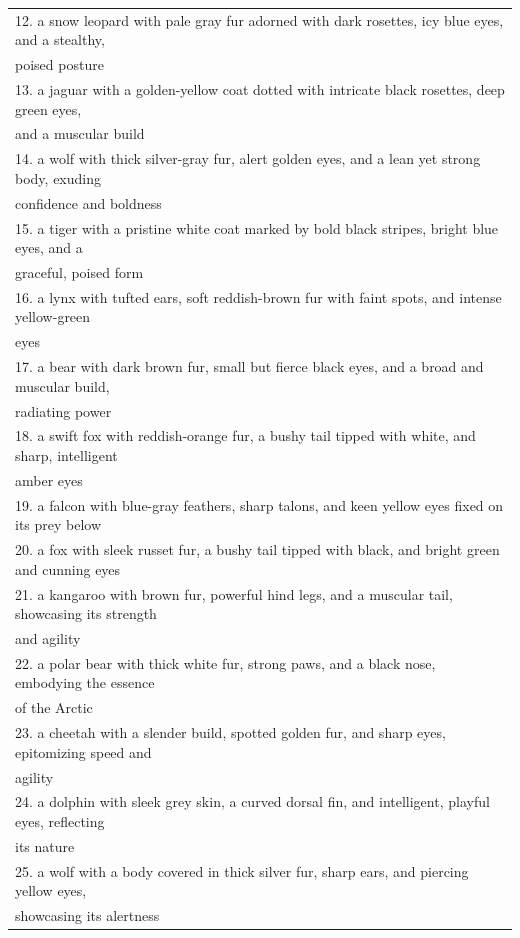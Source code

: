 \begin{table}[!ht]
\begin{threeparttable}
{\begin{tabular}{l}
12. a snow leopard with pale gray fur adorned with dark rosettes, icy blue eyes, and a stealthy, \\ \quad poised posture \\
13. a jaguar with a golden-yellow coat dotted with intricate black rosettes, deep green eyes, \\ \quad and a muscular build \\
14. a wolf with thick silver-gray fur, alert golden eyes, and a lean yet strong body, exuding \\ \quad confidence and boldness \\
15. a tiger with a pristine white coat marked by bold black stripes, bright blue eyes, and a \\ \quad graceful, poised form \\
16. a lynx with tufted ears, soft reddish-brown fur with faint spots, and intense yellow-green \\ \quad eyes \\
17. a bear with dark brown fur, small but fierce black eyes, and a broad and muscular build, \\ \quad radiating power \\
18. a swift fox with reddish-orange fur, a bushy tail tipped with white, and sharp, intelligent \\ \quad amber eyes \\
19. a falcon with blue-gray feathers, sharp talons, and keen yellow eyes fixed on its prey below \\
20. a fox with sleek russet fur, a bushy tail tipped with black, and bright green and cunning eyes \\
21. a kangaroo with brown fur, powerful hind legs, and a muscular tail, showcasing its strength \\ \quad and agility \\
22. a polar bear with thick white fur, strong paws, and a black nose, embodying the essence \\ \quad of the Arctic \\
23. a cheetah with a slender build, spotted golden fur, and sharp eyes, epitomizing speed and \\ \quad agility \\
24. a dolphin with sleek grey skin, a curved dorsal fin, and intelligent, playful eyes, reflecting \\ \quad its nature \\
25. a wolf with a body covered in thick silver fur, sharp ears, and piercing yellow eyes, \\ \quad showcasing its alertness \\

\end{tabular}}
\end{threeparttable}
\end{table}
